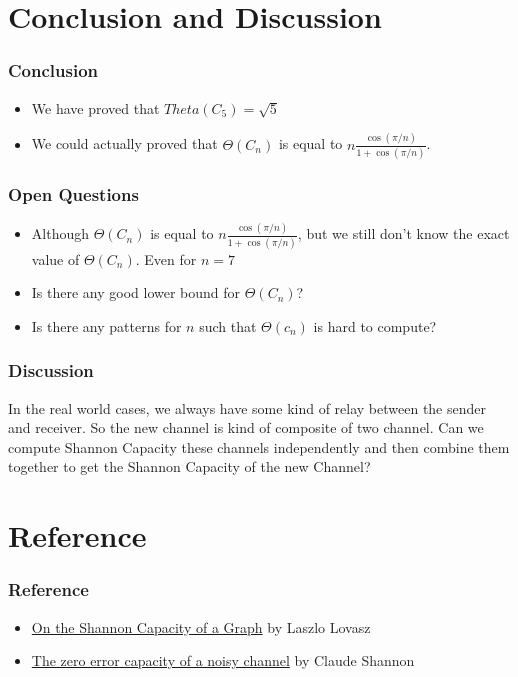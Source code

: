 \section{Conclusion and Discussion}

\begin{frame}
      \frametitle{Conclusion}
      \begin{itemize}
            \item We have proved that $Theta(C_{5}) = \sqrt{5}$
            \item We could actually proved that $\Theta(C_{n})$ is equal to $ n\frac{\cos(\pi/n)}{1+\cos(\pi/n)} $.
      \end{itemize}
\end{frame}

\begin{frame}
      \frametitle{Open Questions}
      \begin{itemize}
            \item Although $\Theta(C_{n})$ is equal to $ n\frac{\cos(\pi/n)}{1+\cos(\pi/n)} $, but we still don't know the exact value of $\Theta(C_{n})$. Even for $n=7$
            \item Is there any good lower bound for $\Theta(C_{n})$?
            \item Is there any patterns for $n$ such that $\Theta(c_{n})$ is hard to compute?
      \end{itemize}
\end{frame}

\begin{frame}
      \frametitle{Discussion}

      In the real world cases, we always have some kind of relay between the sender and receiver. So the new channel is kind of composite of two channel. Can we compute Shannon Capacity these channels independently and then combine them together to get the Shannon Capacity of the new Channel?
\end{frame}

\section{Reference}

\begin{frame}
      \frametitle{Reference}
      \begin{itemize}
            \item \href{https://ieeexplore.ieee.org/stamp/stamp.jsp?arnumber=1055985}{On the Shannon Capacity of a Graph} by Laszlo Lovasz
            \item \href{https://ieeexplore.ieee.org/stamp/stamp.jsp?tp=&arnumber=1056798}{The zero error capacity of a noisy channel} by Claude Shannon
      \end{itemize}
\end{frame}
